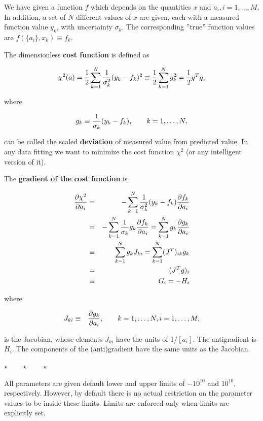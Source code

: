 \documentclass[a4paper,12pt,onecolumn]{article}
\newcommand{\stars}{\begin{center} \vspace{0.5cm}$\star \qquad \star \qquad \star$\vspace{0.5cm}\end{center}}
\begin{document}
We have given a function $f$ which depends on the
quantities $x$ and $a_i, i=1, \ldots, M$. In addition,
a set of $N$ different values of $x$ are given, each with
a measured function value $y_k$, with uncertainty $\sigma_k$.
The corresponding ''true'' function values are
$f(\{a_i\}, x_k) \equiv f_k$.

The dimensionless \textbf{cost function} is defined as

\begin{equation}
\chi^2(a)
= {1 \over 2} \sum_{k=1}^N {1 \over \sigma_k^2} (y_k - f_k)^2
\equiv 
{1 \over 2} \sum_{k=1}^N g_k^2
=
{1 \over 2} g^T g,
\end{equation}

where

\begin{equation}
g_k \equiv {1 \over \sigma_k} (y_k - f_k), \qquad k = 1, \ldots, N,
\end{equation}

can be called the scaled \textbf{deviation} of measured value from
predicted value. In any data fitting we want to minimize the cost
function $\chi^2$ (or any intelligent version of it).

The \textbf{gradient of the cost function} is

\begin{eqnarray}
{\partial \chi^2 \over \partial a_i}
&=& - \sum_{k=1}^N {1 \over \sigma_k^2} (y_k - f_k) {\partial f_k \over \partial a_i} \\
&=& - \sum_{k=1}^N {1 \over \sigma_k} g_k {\partial f_k \over \partial a_i} 
= \sum_{k=1}^N g_k {\partial g_k \over \partial a_i} \\
&\equiv & \sum_{k=1}^N g_k J_{ki}
= \sum_{k=1}^N (J^T)_{ik} g_k \\
&=& (J^T g)_i \\
&\equiv & G_i = - H_i \\
\end{eqnarray}

where

\begin{eqnarray}
J_{ki} & \equiv & {\partial g_k \over \partial a_i},
\qquad k = 1, \ldots, N, i = 1, \ldots, M,
\end{eqnarray}

is the Jacobian, whose elements $J_{ki}$ have the units of 1/$[a_i]$.
The antigradient is $H_i$.
The components of the (anti)gradient have the same units
as the Jacobian.


\stars


All parameters are given default lower and upper limits of $-10^{10}$
and $10^{10}$, respectively. However, by default there is no actual
restriction on the parameter values to be inside these limits.
Limits are enforced only when limits are explicitly set.
\end{document}
